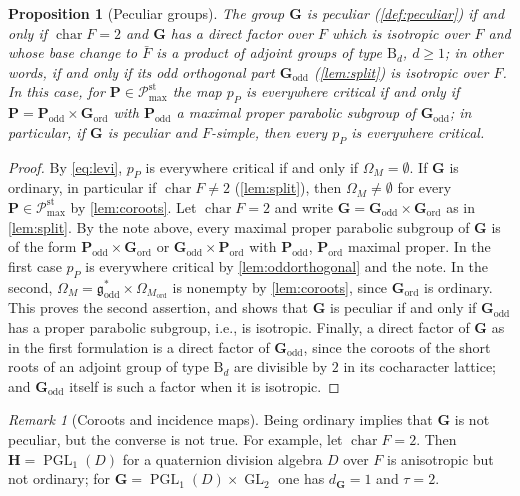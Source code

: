 \documentclass[11pt,reqno]{amsart}
\numberwithin{equation}{section}
\theoremstyle{plain}
\newtheorem{proposition}[theorem]{Proposition}
\theoremstyle{definition}
\theoremstyle{remark}
\newtheorem{remark}[theorem]{Remark}
\theoremstyle{plain}
\newcommand{\bG}{\mathbf{G}}     %
\newcommand{\bP}{\mathbf{P}}     %
\newcommand{\bH}{\mathbf{H}}     %
\newcommand{\Godd}{\bG_{\mathrm{odd}}}
\newcommand{\Gord}{\bG_{\mathrm{ord}}}
\newcommand{\godd}{\g_{\mathrm{odd}}}
\newcommand{\g}{\mathfrak{g}}    %
\newcommand{\Pc}{\mathscr{P}^{\mathrm{st}}_{\mathrm{max}}}    %
\DeclareMathOperator{\GL}{GL}
\DeclareMathOperator{\PGL}{PGL}
\DeclareMathOperator{\chr}{char}   %
\newcommand{\peculiar}{peculiar}
\newcommand{\ordinary}{ordinary}
\newcommand{\oddorth}{odd orthogonal}
\newcommand{\eexp}{\tau}
\newcommand{\dG}{d_{\bG}}
\begin{document}
\begin{proposition}[Peculiar groups]\label{prop:peculiar}
The group $\bG$ is \peculiar{} (\cref{def:peculiar}) if and only if
$\chr F=2$ and $\bG$ has a direct factor over $F$ which is isotropic over $F$
and whose base change to $\bar F$ is a product of adjoint groups of type
$\mathrm B_d$, $d\ge1$; in other words, if and only if its \oddorth{} part
$\Godd$ (\cref{lem:split}) is isotropic over $F$.
In this case, for $\bP\in\Pc$ the map $p_P$ is everywhere critical if and only if
$\bP=\bP_{\mathrm{odd}}\times\Gord$ with $\bP_{\mathrm{odd}}$ a maximal proper parabolic subgroup of
$\Godd$; in particular, if $\bG$ is \peculiar{} and $F$-simple, then every $p_P$
is everywhere critical.
\end{proposition}

\begin{proof}
By \eqref{eq:levi}, $p_P$ is everywhere critical if and only if
$\Omega_M=\emptyset$. If $\bG$ is \ordinary{}, in particular if
$\chr F\ne2$ (\cref{lem:split}), then $\Omega_M\ne\emptyset$ for every
$\bP\in\Pc$ by \cref{lem:coroots}. Let $\chr F=2$ and write
$\bG=\Godd\times\Gord$ as in \cref{lem:split}. By the note above, every
maximal proper parabolic subgroup of $\bG$ is of the form
$\bP_{\mathrm{odd}}\times\Gord$ or $\Godd\times\bP_{\mathrm{ord}}$ with
$\bP_{\mathrm{odd}}$, $\bP_{\mathrm{ord}}$ maximal proper. In the first case
$p_P$ is everywhere critical by \cref{lem:oddorthogonal} and the note. In the
second, $\Omega_M=\godd^*\times\Omega_{M_{\mathrm{ord}}}$ is nonempty by
\cref{lem:coroots}, since $\Gord$ is \ordinary{}. This proves the second
assertion, and shows that $\bG$ is \peculiar{} if and only if $\Godd$ has a
proper parabolic subgroup, i.e., is isotropic. Finally, a direct factor of $\bG$ as in
the first formulation is a direct factor of $\Godd$, since the coroots of the
short roots of an adjoint group of type $\mathrm B_d$ are divisible by $2$ in
its cocharacter lattice; and $\Godd$ itself
is such a factor when it is isotropic.
\end{proof}

\begin{remark}[Coroots and incidence maps]\label{rem:corootincidence}
Being \ordinary{} implies that $\bG$ is not \peculiar{}, but the converse is not true.
For example, let $\chr F=2$. Then $\bH=\PGL_1(D)$ for a quaternion division
algebra $D$ over $F$ is anisotropic but not \ordinary{}; for $\bG=\PGL_1(D)\times\GL_2$ one
has $\dG{}=1$ and $\eexp=2$.
\end{remark}
\end{document}

